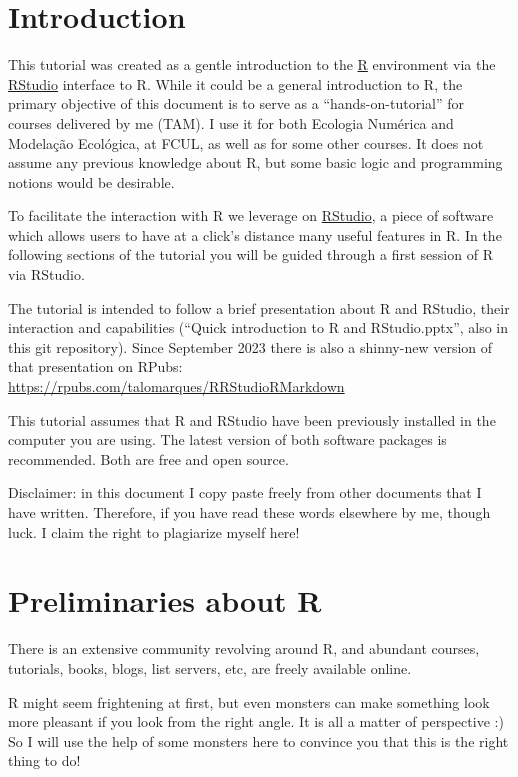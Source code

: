 \documentclass[
]{article}
\begin{document}
\section{Introduction}\label{introduction}

This tutorial was created as a gentle introduction to the
\href{https://www.r-project.org/}{R} environment via the
\href{https://www.rstudio.com/}{RStudio} interface to R. While it could
be a general introduction to R, the primary objective of this document
is to serve as a ``hands-on-tutorial'' for courses delivered by me
(TAM). I use it for both Ecologia Numérica and Modelação Ecológica, at
FCUL, as well as for some other courses. It does not assume any previous
knowledge about R, but some basic logic and programming notions would be
desirable.

To facilitate the interaction with R we leverage on
\href{https://www.rstudio.com/}{RStudio}, a piece of software which
allows users to have at a click's distance many useful features in R. In
the following sections of the tutorial you will be guided through a
first session of R via RStudio.

The tutorial is intended to follow a brief presentation about R and
RStudio, their interaction and capabilities (``Quick introduction to R
and RStudio.pptx'', also in this git repository). Since September 2023
there is also a shinny-new version of that presentation on RPubs:
\url{https://rpubs.com/talomarques/RRStudioRMarkdown}

This tutorial assumes that R and RStudio have been previously installed
in the computer you are using. The latest version of both software
packages is recommended. Both are free and open source.

Disclaimer: in this document I copy paste freely from other documents
that I have written. Therefore, if you have read these words elsewhere
by me, though luck. I claim the right to plagiarize myself here!

\section{Preliminaries about R}\label{preliminaries-about-r}

There is an extensive community revolving around R, and abundant
courses, tutorials, books, blogs, list servers, etc, are freely
available online.

R might seem frightening at first, but even monsters can make something
look more pleasant if you look from the right angle. It is all a matter
of perspective :) So I will use the help of some monsters here to
convince you that this is the right thing to do!
\end{document}
